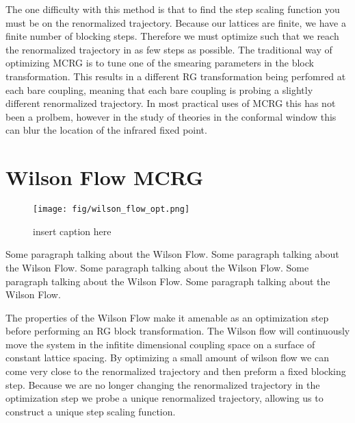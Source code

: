 \documentclass{PoS}
\begin{document}
The one difficulty with this method is that to find the step scaling function you must be on the renormalized trajectory.
Because our lattices are finite, we have a finite number of blocking steps.
Therefore we must optimize such that we reach the renormalized trajectory in as few steps as possible.
The traditional way of optimizing MCRG is to tune one of the smearing parameters in the block transformation.
This results in a different RG transformation being perfomred at each bare coupling, meaning that each bare coupling is probing a slightly different renormalized trajectory.
In most practical uses of MCRG this has not been a prolbem, however in the study of theories in the conformal window this can blur the location of the infrared fixed point.



\section{Wilson Flow MCRG}
\label{sec:wmcrg}
\begin{figure}[th]
  \centering
  \texttt{[image: fig/wilson\_flow\_opt.png]}
  \caption{insert caption here}
  \label{fig:wflow_opt}
\end{figure}

Some paragraph talking about the Wilson Flow.
Some paragraph talking about the Wilson Flow.
Some paragraph talking about the Wilson Flow.
Some paragraph talking about the Wilson Flow.
Some paragraph talking about the Wilson Flow.

The properties of the Wilson Flow make it amenable as an optimization step before performing an RG block transformation.
The Wilson flow will continuously move the system in the infitite dimensional coupling space on a surface of constant lattice spacing.
By optimizing a small amount of wilson flow we can come very close to the renormalized trajectory and then preform a fixed blocking step.
Because we are no longer changing the renormalized trajectory in the optimization step we probe a unique renormalized trajectory, allowing us to construct a unique step scaling function.
\end{document}

